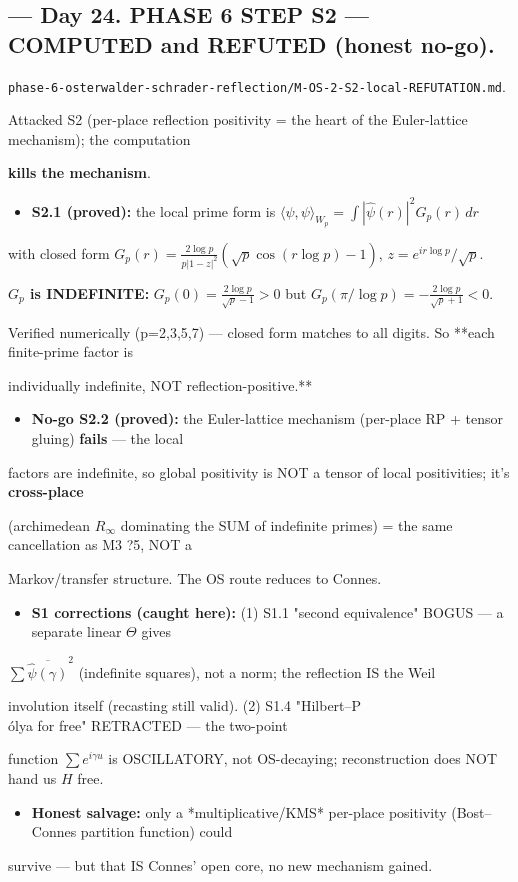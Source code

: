 \documentclass[10pt]{article}
\begin{document}
\subsection*{ --- Day 24. PHASE 6 STEP S2 --- COMPUTED and REFUTED (honest no-go).}
\texttt{phase-6-osterwalder-schrader-reflection/M-OS-2-S2-local-REFUTATION.md}.\par
Attacked S2 (per-place reflection positivity = the heart of the Euler-lattice mechanism); the computation\par
\textbf{kills the mechanism}.\par
\begin{itemize}
\item \textbf{S2.1 (proved):} the local prime form is $\langle\psi,\psi\rangle_{W_p}=\int|\widehat\psi(r)|^2 G_p(r)\,dr$
\end{itemize}
  with closed form $G_p(r)=\frac{2\log p}{p|1-z|^2}(\sqrt p\cos(r\log p)-1)$, $z=e^{ir\log p}/\sqrt p$.\par
  \textbf{$G_p$ is INDEFINITE:} $G_p(0)=\frac{2\log p}{\sqrt p-1}>0$ but $G_p(\pi/\log p)=-\frac{2\log p}{\sqrt p+1}<0$.\par
  Verified numerically (p=2,3,5,7) --- closed form matches to all digits. So **each finite-prime factor is\par
  individually indefinite, NOT reflection-positive.**\par
\begin{itemize}
\item \textbf{No-go S2.2 (proved):} the Euler-lattice mechanism (per-place RP + tensor gluing) \textbf{fails} --- the local
\end{itemize}
  factors are indefinite, so global positivity is NOT a tensor of local positivities; it's \textbf{cross-place}\par
  (archimedean $R_\infty$ dominating the SUM of indefinite primes) = the same cancellation as M3 ?5, NOT a\par
  Markov/transfer structure. The OS route reduces to Connes.\par
\begin{itemize}
\item \textbf{S1 corrections (caught here):} (1) S1.1 "second equivalence" BOGUS --- a separate linear $\Theta$ gives
\end{itemize}
  $\sum\overline{\widehat\psi(\gamma)}^2$ (indefinite squares), not a norm; the reflection IS the Weil\par
  involution itself (recasting still valid). (2) S1.4 "Hilbert--P\\\'olya for free" RETRACTED --- the two-point\par
  function $\sum e^{i\gamma u}$ is OSCILLATORY, not OS-decaying; reconstruction does NOT hand us $H$ free.\par
\begin{itemize}
\item \textbf{Honest salvage:} only a *multiplicative/KMS* per-place positivity (Bost--Connes partition function) could
\end{itemize}
  survive --- but that IS Connes' open core, no new mechanism gained.\par
\end{document}
